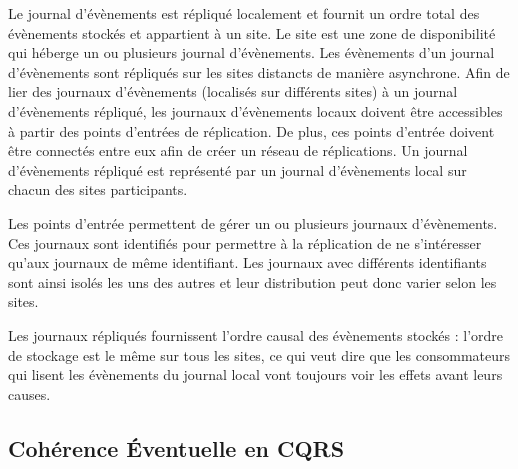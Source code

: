 Le journal d'évènements est répliqué localement et fournit un ordre total des 
évènements stockés et appartient à un site. 
Le site est une zone de disponibilité qui héberge un ou plusieurs 
journal d'évènements. Les évènements d'un journal d'évènements sont 
répliqués sur les sites distancts de manière asynchrone. 
Afin de lier des journaux d'évènements (localisés sur différents sites) à un journal 
d'évènements répliqué, les 
journaux d'évènements locaux doivent être accessibles à partir des points 
d'entrées de réplication. De plus, ces points d'entrée doivent être 
connectés entre eux afin de créer un réseau de réplications. 
Un journal d'évènements répliqué est représenté par un journal d'évènements local 
sur chacun des sites participants.


Les points d'entrée permettent de gérer un ou plusieurs journaux d'évènements. 
Ces journaux sont identifiés pour permettre à la réplication de ne s'intéresser 
qu'aux journaux de même identifiant. 
Les journaux avec différents identifiants sont ainsi isolés les uns des autres et 
leur distribution peut donc varier selon les sites.

Les journaux répliqués fournissent l'ordre causal des évènements stockés : l'ordre 
de stockage est le même sur tous les sites, ce qui veut dire que les 
consommateurs qui lisent les évènements du journal local vont toujours voir les 
effets avant leurs causes.



\subsection{Cohérence Éventuelle en CQRS}



